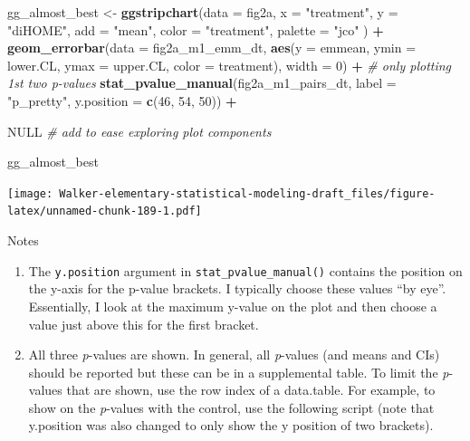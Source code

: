 \documentclass[]{book}
\newenvironment{Shaded}{\begin{snugshade}}{\end{snugshade}}
\newcommand{\CommentTok}[1]{\textcolor[rgb]{0.56,0.35,0.01}{\textit{#1}}}
\newcommand{\DataTypeTok}[1]{\textcolor[rgb]{0.13,0.29,0.53}{#1}}
\newcommand{\DecValTok}[1]{\textcolor[rgb]{0.00,0.00,0.81}{#1}}
\newcommand{\KeywordTok}[1]{\textcolor[rgb]{0.13,0.29,0.53}{\textbf{#1}}}
\newcommand{\NormalTok}[1]{#1}
\newcommand{\OperatorTok}[1]{\textcolor[rgb]{0.81,0.36,0.00}{\textbf{#1}}}
\newcommand{\OtherTok}[1]{\textcolor[rgb]{0.56,0.35,0.01}{#1}}
\newcommand{\StringTok}[1]{\textcolor[rgb]{0.31,0.60,0.02}{#1}}
\providecommand{\tightlist}{%
  \setlength{\itemsep}{0pt}\setlength{\parskip}{0pt}}
\begin{document}
\begin{Shaded}
\begin{Highlighting}[]
\NormalTok{gg_almost_best <-}\StringTok{ }\KeywordTok{ggstripchart}\NormalTok{(}\DataTypeTok{data =}\NormalTok{ fig2a,}
                    \DataTypeTok{x =} \StringTok{"treatment"}\NormalTok{,}
                    \DataTypeTok{y =} \StringTok{"diHOME"}\NormalTok{,}
                    \DataTypeTok{add =} \StringTok{"mean"}\NormalTok{,}
                    \DataTypeTok{color =} \StringTok{"treatment"}\NormalTok{,}
                    \DataTypeTok{palette =} \StringTok{"jco"}
\NormalTok{) }\OperatorTok{+}
\StringTok{  }
\StringTok{  }\KeywordTok{geom_errorbar}\NormalTok{(}\DataTypeTok{data =}\NormalTok{ fig2a_m1_emm_dt,}
                \KeywordTok{aes}\NormalTok{(}\DataTypeTok{y =}\NormalTok{ emmean,}
                    \DataTypeTok{ymin =}\NormalTok{ lower.CL,}
                    \DataTypeTok{ymax =}\NormalTok{ upper.CL,}
                    \DataTypeTok{color =}\NormalTok{ treatment),}
                \DataTypeTok{width =} \DecValTok{0}\NormalTok{) }\OperatorTok{+}
\StringTok{  }
\StringTok{  }\CommentTok{# only plotting 1st two p-values}
\StringTok{  }\KeywordTok{stat_pvalue_manual}\NormalTok{(fig2a_m1_pairs_dt,}
                           \DataTypeTok{label =} \StringTok{"p_pretty"}\NormalTok{, }
                           \DataTypeTok{y.position =} \KeywordTok{c}\NormalTok{(}\DecValTok{46}\NormalTok{, }\DecValTok{54}\NormalTok{, }\DecValTok{50}\NormalTok{)) }\OperatorTok{+}

\StringTok{  }\OtherTok{NULL} \CommentTok{# add to ease exploring plot components}
  
\NormalTok{gg_almost_best}
\end{Highlighting}
\end{Shaded}

\texttt{[image: Walker-elementary-statistical-modeling-draft\_files/figure-latex/unnamed-chunk-189-1.pdf]}

Notes

\begin{enumerate}
\def\labelenumi{\arabic{enumi}.}
\tightlist
\item
  The \texttt{y.position} argument in \texttt{stat\_pvalue\_manual()} contains the position on the y-axis for the p-value brackets. I typically choose these values ``by eye''. Essentially, I look at the maximum y-value on the plot and then choose a value just above this for the first bracket.
\item
  All three \emph{p}-values are shown. In general, all \emph{p}-values (and means and CIs) should be reported but these can be in a supplemental table. To limit the \emph{p}-values that are shown, use the row index of a data.table. For example, to show on the \emph{p}-values with the control, use the following script (note that y.position was also changed to only show the y position of two brackets).
\end{enumerate}
\end{document}
